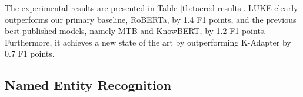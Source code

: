 \documentclass[11pt,a4paper]{article}
\begin{document}
\begin{table}[t]
    \centering
    \setlength{\tabcolsep}{4pt}
    \caption{Results of relation classification on the TACRED dataset.}
    \label{tb:tacred-results}
\end{table}

The experimental results are presented in Table \ref{tb:tacred-results}.
LUKE clearly outperforms our primary baseline, RoBERTa, by 1.4 F1 points, and the previous best published models, namely MTB and KnowBERT, by 1.2 F1 points.
Furthermore, it achieves a new state of the art by outperforming K-Adapter by 0.7 F1 points.

\subsection{Named Entity Recognition}
\label{subsec:ner}
\end{document}
